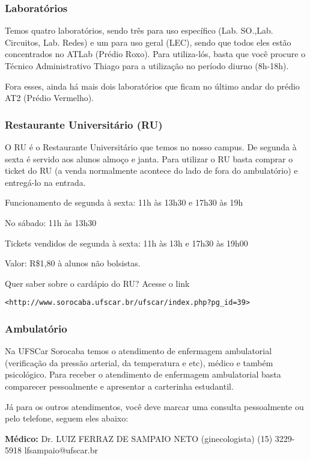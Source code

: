 \subsubsection{Laboratórios}
Temos quatro laboratórios, sendo três para uso específico (Lab. SO.,Lab. Circuitos, Lab. Redes) e um para uso geral (LEC), sendo que todos eles estão concentrados no ATLab (Prédio Roxo). Para utiliza-lós, basta que você procure o Técnico Administrativo Thiago para a utilização no período diurno (8h-18h).

Fora esses, ainda há mais dois laboratórios que ficam no último andar do prédio AT2 (Prédio Vermelho).

\subsubsection{Restaurante Universitário (RU)}
O RU é o Restaurante Universitário que temos no nosso campus. De segunda à sexta é servido aos alunos almoço e janta. Para utilizar o RU basta comprar o ticket do RU (a venda normalmente acontece do lado de fora do ambulatório) e entregá-lo na entrada.

Funcionamento de segunda à sexta: 11h às 13h30 e 17h30 às 19h

No sábado: 11h às 13h30

Tickets vendidos de segunda à sexta: 11h às 13h e 17h30 às 19h00

Valor: R\$1,80 à alunos não bolsistas.

Quer saber sobre o cardápio do RU? Acesse o link

\texttt{<http://www.sorocaba.ufscar.br/ufscar/index.php?pg\_id=39>}

\subsubsection{Ambulatório}
Na UFSCar Sorocaba temos o atendimento de enfermagem ambulatorial (verificação da pressão arterial, da temperatura e etc), médico e também psicológico. Para receber o atendimento de enfermagem ambulatorial basta comparecer pessoalmente e apresentar a carterinha estudantil.

Já para os outros atendimentos, você deve marcar uma consulta pessoalmente ou pelo telefone, seguem eles abaixo:

\noindent \textbf{Médico:}
\newline Dr. LUIZ FERRAZ DE SAMPAIO NETO (ginecologista)
\newline (15) 3229-5918
\newline lfsampaio@ufscar.br

